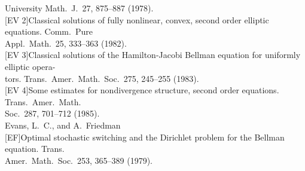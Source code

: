 \begin{flushleft}
University Math.\ J.\ 27, 875--887 (1978).\\
{}[EV 2]\quad Classical solutions of fully nonlinear, convex, second order elliptic equations. Comm.\ Pure\\
Appl.\ Math.\ 25, 333--363 (1982).\\
{}[EV 3]\quad Classical solutions of the Hamilton-Jacobi Bellman equation for uniformly elliptic opera-\\
tors. Trans.\ Amer.\ Math.\ Soc.\ 275, 245--255 (1983).\\
{}[EV 4]\quad Some estimates for nondivergence structure, second order equations. Trans.\ Amer.\ Math.\\
Soc.\ 287, 701--712 (1985).\\[1ex]
Evans, L.\ C., and A.\ Friedman\\
{}[EF]\quad Optimal stochastic switching and the Dirichlet problem for the Bellman equation. Trans.\\
Amer.\ Math.\ Soc.\ 253, 365--389 (1979).
\end{flushleft}



